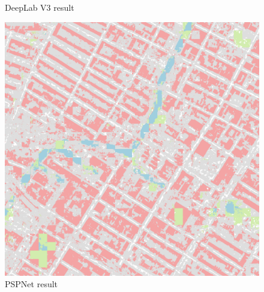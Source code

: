 \documentclass[]{IEEEtran}
\begin{document}
\begin{figure}[!hbt]
\begin{center}
\begin{minipage}[t]{0.21\textwidth}
				\caption{DeepLab V3 result}
				\label{fig:dlv3}
			\end{minipage}
		\end{center}
	\end{figure}

\begin{figure}[!hbt]
	\begin{center}
		\vspace{-0.5cm}
		\begin{minipage}[t]{0.21\textwidth}
			\includegraphics[width=\columnwidth]{psp_out}
			\caption{PSPNet result}
			\label{fig:psp}
		\end{minipage}
		\hspace{0.5cm}
		\begin{minipage}[t]{0.21\textwidth}

\end{minipage}
\end{center}
\end{figure}
\end{document}
